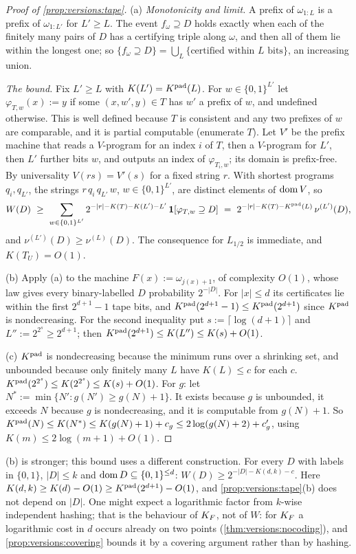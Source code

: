 \begin{proof}[Proof of \cref{prop:versions:tape}]
(a) \emph{Monotonicity and limit.} A prefix of $\omega_{1:L}$ is a prefix of $\omega_{1:L'}$ for $L'\ge L$. The event $f_\omega\supseteq D$ holds exactly when each of the finitely many pairs of $D$ has a certifying triple along $\omega$, and then all of them lie within the longest one; so $\{f_\omega\supseteq D\}=\bigcup_L\{\text{certified within }L\text{ bits}\}$, an increasing union.

\emph{The bound.} Fix $L'\ge L$ with $K(L')=K^{\mathrm{pad}}(L)$. For $w\in\{0,1\}^{L'}$ let $\varphi_{T,w}(x):=y$ if some $(x,w',y)\in T$ has $w'$ a prefix of $w$, and undefined otherwise. This is well defined because $T$ is consistent and any two prefixes of $w$ are comparable, and it is partial computable (enumerate $T$). Let $V'$ be the prefix machine that reads a $V$-program for an index $i$ of $T$, then a $V$-program for $L'$, then $L'$ further bits $w$, and outputs an index of $\varphi_{T_i,w}$; its domain is prefix-free. By universality $V(rs)=V'(s)$ for a fixed string $r$. With shortest programs $q_i,q_{L'}$, the strings $r\,q_i\,q_{L'}\,w$, $w\in\{0,1\}^{L'}$, are distinct elements of $\operatorname{dom} V$, so
\[
W(D)\ \ge\ \sum_{w\in\{0,1\}^{L'}}2^{-|r|-K(T)-K(L')-L'}\,\ind[\varphi_{T,w}\supseteq D]\ =\ 2^{-|r|-K(T)-\Kpad(L)}\,\nu^{(L')}(D),
\]
and $\nu^{(L')}(D)\ge\nu^{(L)}(D)$.
The consequence for $L_{1/2}$ is immediate, and $K(T_U)=O(1)$.

(b) Apply (a) to the machine $F(x):=\omega_{j(x)+1}$, of complexity $O(1)$, whose law gives every binary-labelled $D$ probability $2^{-|D|}$. For $|x|\le d$ its certificates lie within the first $2^{d+1}-1$ tape bits, and $K^{\mathrm{pad}}(2^{d+1}-1)\le K^{\mathrm{pad}}(2^{d+1})$ since $K^{\mathrm{pad}}$ is nondecreasing. For the second inequality put $s:=\lceil\log(d+1)\rceil$ and $L'':=2^{2^s}\ge2^{d+1}$; then $K^{\mathrm{pad}}(2^{d+1})\le K(L'')\le K(s)+O(1)$.

(c) $K^{\mathrm{pad}}$ is nondecreasing because the minimum runs over a shrinking set, and unbounded because only finitely many $L$ have $K(L)\le c$ for each $c$. $K^{\mathrm{pad}}(2^{2^s})\le K(2^{2^s})\le K(s)+O(1)$. For $g$: let $N^*:=\min\{N':g(N')\ge g(N)+1\}$. It exists because $g$ is unbounded, it exceeds $N$ because $g$ is nondecreasing, and it is computable from $g(N)+1$. So $K^{\mathrm{pad}}(N)\le K(N^*)\le K(g(N)+1)+c_g\le2\log(g(N)+2)+c'_g$, using $K(m)\le2\log(m+1)+O(1)$.
\end{proof}

\begin{remark}\label{rem:versions:hashing}
(b) is stronger; this bound uses a different construction. For every $D$ with labels in $\{0,1\}$, $|D|\le k$ and $\operatorname{dom} D\subseteq\{0,1\}^{\le d}$: $W(D)\ge2^{-|D|-K(d,k)-c}$. Here $K(d,k)\ge K(d)-O(1)\ge K^{\mathrm{pad}}(2^{d+1})-O(1)$, and \cref{prop:versions:tape}(b) does not depend on $|D|$. One might expect a logarithmic factor from $k$-wise independent hashing; that is the behaviour of $K_{F}$, not of $W$: for $K_{F}$ a logarithmic cost in $d$ occurs already on two points (\cref{thm:versions:nocoding}), and \cref{prop:versions:covering} bounds it by a covering argument rather than by hashing.
\end{remark}


